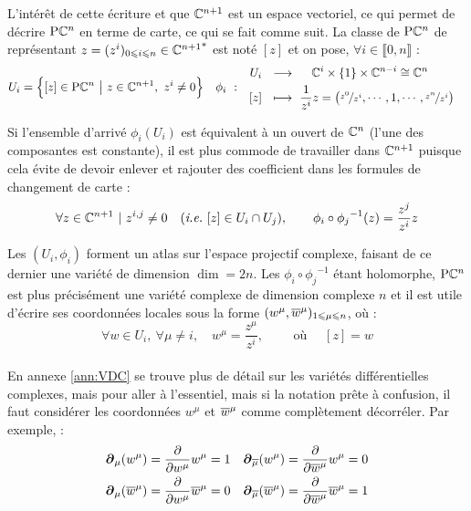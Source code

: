 L'intérêt de cette écriture et que $\mathbb{C}^{n+1}$ est un espace vectoriel, ce qui permet de décrire $\text{\normalfont P}\mathbb{C}^{n}$ en terme de carte, ce qui se fait comme suit.
La classe de $\text{\normalfont P}\mathbb{C}^{n}$ de représentant $z = (z^i)_{0\leqslant i\leqslant n}\in{\mathbb{C}^{n+1}}^*$ est noté $[z]$ et on pose, $\forall i\in\llbracket0,n\rrbracket$ :
\begin{align}
	U_i &= \Big\{[z]\in\text{\normalfont P}\mathbb{C}^{n}\ \big|\ z\in \mathbb{C}^{n+1},\ z^i\neq 0\Big\}  &  \phi_i\  :\quad &\begin{aligned}
		U_i\ \ &\longrightarrow\quad\ \mathbb{C}^{i}\times \{1\} \times\mathbb{C}^{n-i}\cong \mathbb{C}^{n} \\ [z]\ \ &\longmapsto\ \frac{1}{z^i}z = \big(\nicefrac{z^0}{z^i},\cdots, 1, \cdots, \nicefrac{z^n}{z^i}\big)
	\end{aligned}
\end{align}
\begin{remarque}
	Si l'ensemble d'arrivé $\phi_i(U_i)$ est équivalent à un ouvert de $\mathbb{C}^{n}$ (l'une des composantes est constante), il est plus commode de travailler dans $\mathbb{C}^{n+1}$ puisque cela évite de devoir enlever et rajouter des coefficient dans les formules de changement de carte :
	\[ \forall z\in\C^{n+1}\ |\ z^{i,j}\neq 0\quad (\ie~[z]\in U_i\cap U_j) ,\qquad \phi_i \circ {\phi_j}^{-1}(z) = \frac{z^j}{z^i}z\]
\end{remarque}
\skipl
Les $(U_i,\phi_i)$ forment un atlas sur l'espace projectif complexe, faisant de ce dernier une variété de dimension $\dim = 2n$. Les $\phi_i \circ {\phi_j}^{-1}$ étant holomorphe, $\text{\normalfont P}\mathbb{C}^{n}$ est plus précisément une variété complexe de dimension complexe $n$ et il est utile d'écrire ses coordonnées locales sous la forme $(w^\mu, \overline{w}^\mu)_{1\leqslant \mu \leqslant n}$, où :
\[\forall w\in U_i,\ \forall \mu\neq i,\quad w^\mu = \frac{z^\mu}{z^i},\qquad  \text{ où }\quad [z] = w\]
\\
En annexe \ref{ann:VDC} se trouve plus de détail sur les variétés différentielles complexes, mais pour aller à l'essentiel, mais si la notation prête à confusion, il faut considérer les coordonnées $w^\mu$ et $\overline{w}^\mu$ comme complètement décorréler. Par exemple, :
\begin{align*}
	\boldsymbol{\partial}_\mu(w^\mu) &= \frac{\partial}{\partial w^\mu} w^\mu = 1  &  
	\boldsymbol{\partial}_{\overline{\mu}}(w^\mu) = \frac{\partial}{\partial \overline{w}^\mu} w^\mu &= 0 
		\\
	\boldsymbol{\partial}_\mu(\overline{w}^\mu) &= \frac{\partial}{\partial w^\mu} \overline{w}^\mu = 0  &  
	\boldsymbol{\partial}_{\overline{\mu}}(\overline{w}^\mu) = \frac{\partial}{\partial \overline{w}^\mu} \overline{w}^\mu &= 1
\end{align*}
